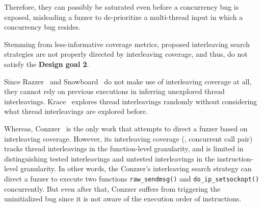 Therefore, they can possibly be saturated even before a concurrency
bug is exposed, misleading a fuzzer to de-prioritize a multi-thread
input in which a concurrency bug resides.







%
Stemming from less-informative coverage metrics, proposed interleaving
search strategies are not properly directed by interleaving coverage,
and thus, do not satisfy the \textbf{Design goal 2}.

Since Razzer~\cite{razzer} and Snowboard~\cite{snowboard} do not make
use of interleaving coverage at all, they cannot rely on previous
executions in inferring unexplored thread interleavings.
%
Krace~\cite{krace} explores thread interleavings randomly without
considering what thread interleavings are explored before.

Whereas, Conzzer~\cite{conzzer} is the only work that attempts to
direct a fuzzer based on interleaving coverage.
%
However, its interleaving coverage (\ie, concurrent call pair) tracks
thread interleavings in the function-level granularity, and is limited
in distinguishing tested interleavings and untested interleavings in
the instruction-level granularity.
%
In other words, the Conzzer's interleaving search strategy can direct
a fuzzer to execute two functions \texttt{raw_sendmsg()} and
\texttt{do_ip_setsockopt()} concurrently.
%
But even after that, Conzzer suffers from triggering the uninitialized
bug since it is not aware of the execution order of instructions.




